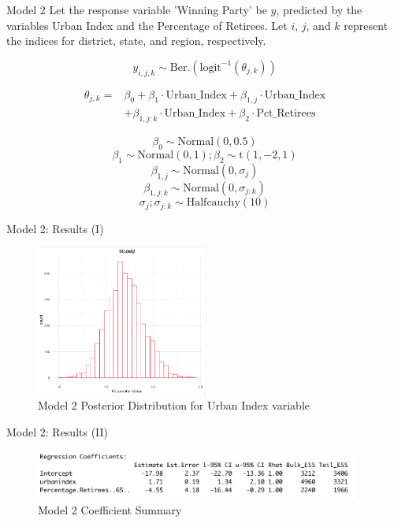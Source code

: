 \documentclass{beamer}
\begin{document}
\begin{frame}{Model 2}
    Let the response variable 'Winning Party' be \(y\), predicted by the variables Urban Index and the Percentage of Retirees. Let \(i\), \(j\), and \(k\) represent the indices for district, state, and region, respectively.

    \[
    y_{i,j,k} \sim \text{Ber.}\left(\text{logit}^{-1}(\theta_{j,k})\right)
    \]

\[
\begin{aligned}
\theta_{j,k} =    &\beta_0 + \beta_1 \cdot \text{Urban\_Index} + \beta_{1,j} \cdot \text{Urban\_Index} \\
    &+ \beta_{1,j:k} \cdot \text{Urban\_Index} + \beta_2 \cdot \text{Pct\_Retirees}
\end{aligned}
\]



    \[\beta_0 \sim \text{Normal}(0, 0.5)\]
    \[\beta_1 \sim \text{Normal}(0, 1); \beta_2 \sim \text{t}(1,-2,1)\]
    \[\beta_{1,j} \sim \text{Normal}(0, \sigma_j)\]
    \[\beta_{1,j:k} \sim \text{Normal}(0, \sigma_{j:k})\]
    \[ \sigma_j; \sigma_{j:k} \sim \text{Halfcauchy}(10)\]

    
\end{frame}



\begin{frame}{Model 2: Results (I)}
    \begin{figure}
        \caption{Model 2 Posterior Distribution for Urban Index variable}
        \includegraphics[width=0.5\textwidth]{plots/model2_postui.png}
    \end{figure}
\end{frame}


\begin{frame}{Model 2: Results (II)}
    \begin{figure}
                \caption{Model 2 Coefficient Summary}
        \includegraphics[width=0.95\textwidth]{plots/model2_coeff.png}
    \end{figure}
\end{frame}
\end{document}
